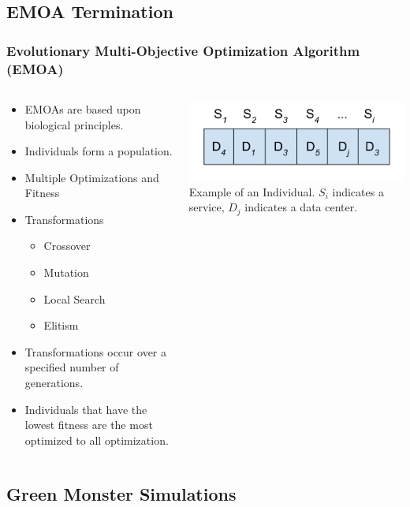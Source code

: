 \documentclass{beamer}
\begin{document}
\subsection[Termination]{EMOA Termination}
\begin{frame}
\frametitle{Evolutionary Multi-Objective Optimization Algorithm (EMOA)}
\begin{columns}
\begin{column}{0.65\textwidth}
  \begin{itemize}
  	\item EMOAs are based upon biological principles.
	\item Individuals form a population.
	\item Multiple Optimizations and Fitness
	\item Transformations
		\begin{itemize}
		\item Crossover
		\item Mutation
		\item Local Search
		\item Elitism
		\end{itemize}
	\item Transformations occur over a specified number of generations.
	\item Individuals that have the lowest fitness are the most optimized to all optimization. 
  \end{itemize}
\end{column}
\begin{column}{0.35\textwidth}
\includegraphics[width=.95\textwidth]{Individual.png} \\
\tiny{Example of an Individual. $S_i$ indicates a service, $D_j$ indicates a data center.}
\end{column}
\end{columns}
\end{frame}

\subsection[Simulations]{Green Monster Simulations}
\end{document}
